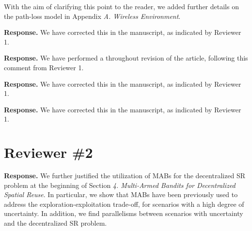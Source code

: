 \documentclass[a4paper,twoside,11pt]{reviewresponse}
\begin{document}
    With the aim of clarifying this point to the reader, we added further details on the path-loss model in Appendix \textit{A. Wireless Environment}.  
	
	\textbf{Response.} We have corrected this in the manuscript, as indicated by Reviewer 1. 
	
	
	\textbf{Response.} We have performed a throughout revision of the article, following this comment from Reviewer 1.
	
	
	\textbf{Response.} We have corrected this in the manuscript, as indicated by Reviewer 1.
	
	
	\textbf{Response. } We have corrected this in the manuscript, as indicated by Reviewer 1.
	
	\section{Reviewer \#2}
	
	
	
	\textbf{Response.} We further justified the utilization of MABs for the decentralized SR problem at the beginning of Section \textit{4. Multi-Armed Bandits for Decentralized Spatial Reuse}. In particular, we show that MABs have been previously used to address the exploration-exploitation trade-off, for scenarios with a high degree of uncertainty. In addition, we find parallelisms between scenarios with uncertainty and the decentralized SR problem.
	
\end{document}
